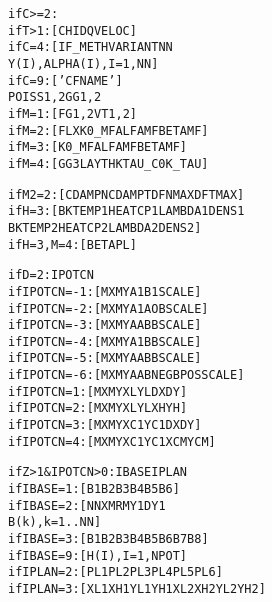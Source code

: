 \documentclass[12pt]{report}
\renewcommand{\magenta}[1]{}
\begin{document}
\begin{alltt}
if C>=2:\magenta{
      if T<=1 & M=5: [ DT                   ]}
      if T>1: [ CHI  DQ   VELOC             ]
      if C=4: [ IF\_METH   VARIANT   NN
                Y(I), ALPHA(I), I=1,NN      ]
      if C=9: [ 'CFNAME'                    ]
                POISS 1, 2   GG 1, 2
\magenta{      if B=1: [ FLXZ                        ]
}      if M=1: [ FG 1, 2   VT 1, 2           ]
      if M=2: [ FLX  K0\_MF   ALFAMF  BETAMF ]
      if M=3: [      K0\_MF   ALFAMF  BETAMF ]
      if M=4: [ GG3  LAYTHK  TAU\_C0  K\_TAU  ]

% Material parameters for damping and temperature calculation (section \ref{sec:matcns}):

if M2=2:     [ CDAMPN   CDAMPT   DFNMAX   DFTMAX ]
if H=3:      [ BKTEMP1  HEATCP1  LAMBDA1  DENS1           
               BKTEMP2  HEATCP2  LAMBDA2  DENS2  ]
if H=3, M=4: [ BETAPL                            ]

% Information needed for the grid discretization (section \ref{sec:pot_con}).
% Hertzian options when IPOTCN<0 (sections \ref{sec:hertz3d}, \ref{sec:hertz2d}, \ref{sec:sdec}), direct
% specification of potential contact area when IPOTCN>0 (section \ref{sec:nonhzvar}).

if D=2: IPOTCN
      if IPOTCN=-1: [ MX  MY  A1  B1   SCALE ]
      if IPOTCN=-2: [ MX  MY  A1  AOB  SCALE ]
      if IPOTCN=-3: [ MX  MY  AA  BB   SCALE ]
      if IPOTCN=-4: [ MX  MY  A1  BB   SCALE ]
      if IPOTCN=-5: [ MX  MY  AA  BB   SCALE ]
      if IPOTCN=-6: [ MX  MY  AA  BNEG BPOS SCALE ]
      if IPOTCN= 1: [ MX  MY  XL  YL   DX   DY  ]
      if IPOTCN= 2: [ MX  MY  XL  YL   XH   YH  ]
      if IPOTCN= 3: [ MX  MY  XC1 YC1  DX   DY  ]
      if IPOTCN= 4: [ MX  MY  XC1 YC1  XCM  YCM ]

% Information for the undeformed distance calculation, when not using
% a Hertzian option above (section \ref{sec:ibase}):

if Z>1 & IPOTCN>0: IBASE   IPLAN
      if IBASE= 1:  [ B1   B2   B3   B4   B5   B6            ]
      if IBASE= 2:  [ NN   XM   RM   Y1   DY1
                      B(k), k=1..NN                          ]
      if IBASE= 3:  [ B1   B2   B3   B4   B5   B6   B7   B8  ]
      if IBASE= 9:  [ H(I), I=1,NPOT                         ]
      if IPLAN= 2:  [ PL1  PL2  PL3  PL4  PL5  PL6           ]
      if IPLAN= 3:  [ XL1  XH1  YL1  YH1  XL2  XH2  YL2  YH2 ]
\magenta{      if IPLAN= 4:  [ NPATCH
                     (XL(I), XH(I), YL(I), YH(I)), I=1,NPATCH
                     (FAC(I,J), J=I+1,NPATCH), I=1,NPATCH-1  ]
}\magenta{
% Variable friction per grid row IY (section \ref{sec:varfrc}):
if VARFRC=3:
      if L=0: [ FSTAT  FKIN                                ], MY times
      if L=2: [ FKIN   FLIN1  SABSH1  FLIN2  SABSH2        ], MY times
      if L=3: [ FKIN   FRAT1  SABSH1  FRAT2  SABSH2        ], MY times
      if L=4: [ FKIN   FEXP1  SABSH1  FEXP2  SABSH2        ], MY times
      if L=6: [ FREF   TREF   DFHEAT  DTHEAT               ], MY times
      if L=2,3,4,6: [ MEMDST MEM\_S0                        ]
}
% Kinematics, extra terms to tangential right hand side (section \ref{sec:kincns}):


\end{alltt}
\end{document}

